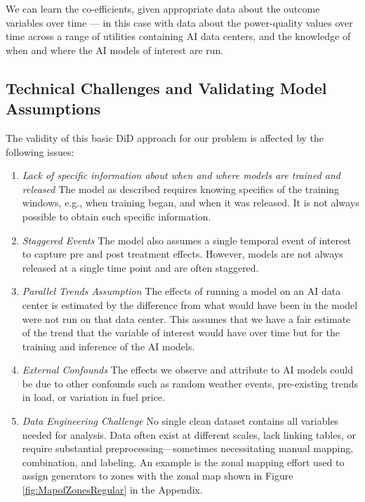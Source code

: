 \documentclass[a4paper,fleqn,longmktitle]{cas-sc}
\newcommand{\nb}[1]{\textcolor{blue}{NB[#1]}}
\theoremstyle{plain}
\theoremstyle{definition}
\begin{document}
We can learn the co-efficients, given appropriate data about the outcome variables over time --- in this case with data about the power-quality values over time across a range of utilities containing AI data centers, and the knowledge of when and where the AI models of interest are run.



\subsection{Technical Challenges and Validating Model Assumptions}\label{DCASSUmptions}
The validity of this basic DiD approach for our problem is affected by the following issues:
\begin{enumerate}
    \item \textit{Lack of specific information about when and where models are trained and released} The model as described requires knowing specifics of the training windows, e.g., when training began, and when it was released. It is not always possible to obtain such specific information. 
    \item \textit{Staggered Events} The model also assumes a single temporal event of interest to capture pre and post treatment effects. However, models are not always released at a single time point and are often staggered.    
    \item \textit{Parallel Trends Assumption} The effects of running a model on an AI data center is estimated by the difference from what would have been in the model were not run on that data center. This assumes that we have a fair estimate of the trend that the variable of interest would have over time but for the training and inference of the AI models. 
   
    \item \textit{External Confounds} The effects we observe and attribute to AI models could be due to other confounds such as random weather events, pre-existing trends in load, or variation in fuel price.
    \item \textit{Data Engineering Challenge} No single clean dataset contains all variables needed for analysis. Data often exist at different scales, lack linking tables, or require substantial preprocessing—sometimes necessitating manual mapping, combination, and labeling. An example is the zonal mapping effort used to assign generators to zones with the zonal map shown in Figure \ref{fig:MapofZonesRegular} in the Appendix.
\end{enumerate}
    
\end{document}
